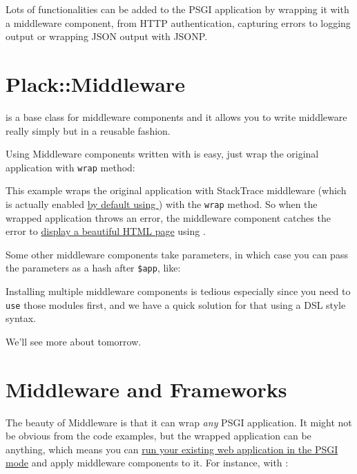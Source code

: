 Lots of functionalities can be added to the PSGI application by wrapping
it with a middleware component, from HTTP authentication, capturing
errors to logging output or wrapping JSON output with JSONP.

\section{Plack::Middleware}\label{plackmiddleware}

\href{http://search.cpan.org/perldoc?Plack::Middleware}{}
is a base class for middleware components and it allows you to write
middleware really simply but in a reusable fashion.

Using Middleware components written with  is easy, just
wrap the original application with \lstinline!wrap! method:


This example wraps the original application with StackTrace middleware
(which is actually enabled
\href{http://advent.plackperl.org/2009/12/day-3-using-plackup.html}{by
default using }) with the \lstinline!wrap! method. So when the
wrapped application throws an error, the middleware component catches
the error to
\href{http://bulknews.typepad.com/blog/2009/10/develstacktraceashtml.html}{display
a beautiful HTML page} using .

Some other middleware components take parameters, in which case you can
pass the parameters as a hash after \lstinline!$app!, like:


Installing multiple middleware components is tedious especially since
you need to \lstinline!use! those modules first, and we have a quick
solution for that using a DSL style syntax.


We'll see more about  tomorrow.

\section{Middleware and Frameworks}\label{middleware-and-frameworks}

The beauty of Middleware is that it can wrap \emph{any} PSGI
application. It might not be obvious from the code examples, but the
wrapped application can be anything, which means you can
\href{http://advent.plackperl.org/2009/12/day-7-use-web-application-framework-in-psgi.html}{run
your existing web application in the PSGI mode} and apply middleware
components to it. For instance, with :

